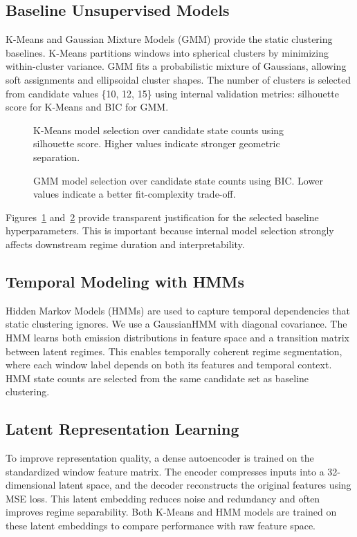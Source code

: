 \documentclass[conference]{IEEEtran}
\begin{document}
\subsection{Baseline Unsupervised Models}
K-Means and Gaussian Mixture Models (GMM) provide the static clustering baselines. K-Means partitions windows into spherical clusters by minimizing within-cluster variance. GMM fits a probabilistic mixture of Gaussians, allowing soft assignments and ellipsoidal cluster shapes. The number of clusters is selected from candidate values \{10, 12, 15\} using internal validation metrics: silhouette score for K-Means and BIC for GMM.

\begin{figure}[t]
\centering

\caption{K-Means model selection over candidate state counts using silhouette score. Higher values indicate stronger geometric separation.}
\label{fig:kmeans_selection}
\end{figure}

\begin{figure}[t]
\centering

\caption{GMM model selection over candidate state counts using BIC. Lower values indicate a better fit-complexity trade-off.}
\label{fig:gmm_selection}
\end{figure}

Figures~\ref{fig:kmeans_selection} and~\ref{fig:gmm_selection} provide transparent justification for the selected baseline hyperparameters. This is important because internal model selection strongly affects downstream regime duration and interpretability.

\subsection{Temporal Modeling with HMMs}
Hidden Markov Models (HMMs) are used to capture temporal dependencies that static clustering ignores. We use a GaussianHMM with diagonal covariance. The HMM learns both emission distributions in feature space and a transition matrix between latent regimes. This enables temporally coherent regime segmentation, where each window label depends on both its features and temporal context. HMM state counts are selected from the same candidate set as baseline clustering.

\subsection{Latent Representation Learning}
To improve representation quality, a dense autoencoder is trained on the standardized window feature matrix. The encoder compresses inputs into a 32-dimensional latent space, and the decoder reconstructs the original features using MSE loss. This latent embedding reduces noise and redundancy and often improves regime separability. Both K-Means and HMM models are trained on these latent embeddings to compare performance with raw feature space.
\end{document}
